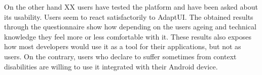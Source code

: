 On the other hand XX users have tested the platform and have been asked about 
its usability. Users seem to react satisfactorily to AdaptUI. The obtained 
results through the questionnaire show how depending on the users ageing and 
technical knowledge they feel more or less comfortable with it. These results
also exposes how most developers would use it as a tool for their applications, 
but not as users. On the contrary, users who declare to suffer sometimes from
context disabilities are willing to use it integrated with their Android device.

% 
% 
% 
